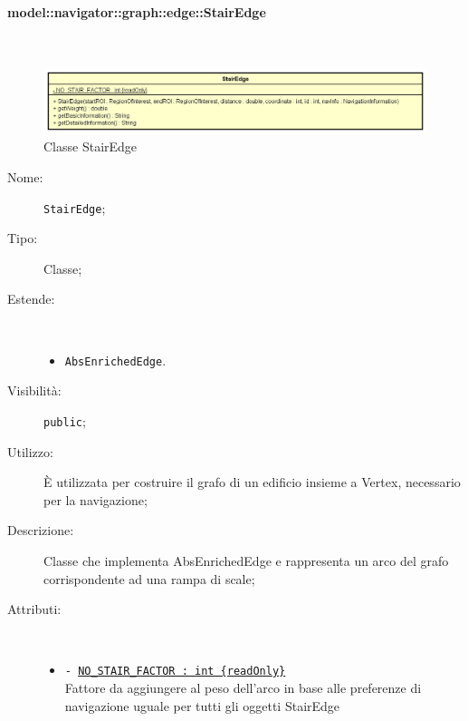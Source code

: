 \documentclass[../DefinizioneDiProdotto.tex]{subfiles}
\begin{document}
\paragraph{model::navigator::graph::edge::StairEdge}
\
\begin{figure}[H]
	\centering
	\includegraphics[width=\maxwidth]{img/StairEdge.png}
	\caption{Classe StairEdge}\label{fig:model::navigator::graph::edge::StairEdge} 
\end{figure}
\begin{description}
	\item[Nome:] \texttt{StairEdge};
	\item[Tipo:] Classe;
	\item[Estende:] \
	\begin{itemize}
		\item \texttt{AbsEnrichedEdge}.
	\end{itemize}
	\item[Visibilità:] \texttt{public};
	\item[Utilizzo:] È utilizzata per costruire il grafo di un edificio insieme a Vertex, necessario per la navigazione;
	\item[Descrizione:] Classe che implementa AbsEnrichedEdge e rappresenta un arco del grafo corrispondente ad una rampa di scale;
	\item[Attributi:] \
	\begin{itemize}
		\item \texttt{- \underline{NO\_STAIR\_FACTOR : int \{readOnly\}}}\\
		Fattore da aggiungere al peso dell'arco in base alle preferenze di navigazione uguale per tutti gli oggetti StairEdge
		

\end{itemize}
\end{description}
\end{document}
